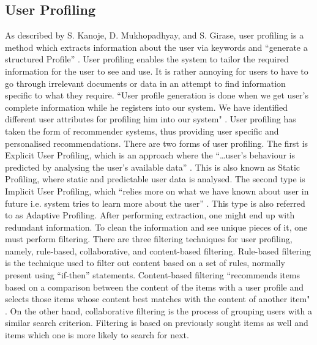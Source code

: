 \documentclass{aifyp}
\begin{document}
\subsection{User Profiling}
\indent As described by  S. Kanoje, D. Mukhopadhyay, and S. Girase, user profiling is a method which extracts information about the user via keywords and ``generate a structured Profile” \cite{KANOJE20165}. User profiling enables the system to tailor the required information for the user to see and use. It is rather annoying for users to have to go through irrelevant documents or data in an attempt to find information specific to what they require.
\newline
\newline
\indent ``User profile generation is done when we get user’s complete information while he registers into our system. We have identified different user attributes for profiling him into our system" \cite{KANOJE20165}.  User profiling has taken the form of recommender systems, thus providing user specific and personalised recommendations. There are two forms of user profiling. The first is Explicit User Profiling, which is an approach where the ``…user’s behaviour is predicted by analysing the user’s available data” \cite{Kanoje2015UserPT}. This is also known as Static Profiling, where static and predictable user data is analysed. The second type is Implicit User Profiling, which ``relies more on what we have known about user in future i.e. system tries to learn more about the user” \cite{Kanoje2015UserPT}. This type is also referred to as Adaptive Profiling. After performing extraction, one might end up with redundant information.
\newline
\newline
\indent To clean the information and see unique pieces of it, one must perform filtering. There are three filtering techniques for user profiling, namely, rule-based, collaborative, and content-based filtering. Rule-based filtering is the technique used to filter out content based on a set of rules, normally present using ``if-then” statements. Content-based filtering ``recommends items based on a comparison between the content of the items with a user profile and selects those items whose content best matches with the content of another item" \cite{Kanoje2015UserPT}. On the other hand, collaborative filtering is the process of grouping users with a similar search criterion. Filtering is based on previously sought items as well and items which one is more likely to search for next.
\pagebreak
\end{document}

